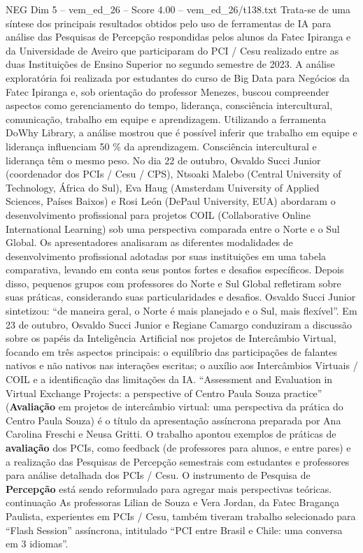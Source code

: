 \begin{textsample}{NEG Dim 5 – vem\_ed\_26 – Score 4.00 – vem\_ed\_26/t138.txt}
Trata-se de uma síntese dos principais resultados obtidos pelo uso de ferramentas de IA para análise das Pesquisas de Percepção respondidas pelos alunos da Fatec Ipiranga e da Universidade de Aveiro que participaram do PCI / Cesu realizado entre as duas Instituições de Ensino Superior no segundo semestre de 2023.
A análise exploratória foi realizada por estudantes do curso de Big Data para Negócios da Fatec Ipiranga e, sob orientação do professor Menezes, buscou compreender aspectos como gerenciamento do tempo, liderança, consciência intercultural, comunicação, trabalho em equipe e aprendizagem.
Utilizando a ferramenta DoWhy Library, a análise mostrou que é possível inferir que trabalho em equipe e liderança influenciam 50 \% da aprendizagem.
Consciência intercultural e liderança têm o mesmo peso.
No dia 22 de outubro, Osvaldo Succi Junior (coordenador dos PCIs / Cesu / CPS), Ntsoaki Malebo (Central University of Technology, África do Sul), Eva Haug (Amsterdam University of Applied Sciences, Países Baixos) e Rosi León (DePaul University, EUA) abordaram o desenvolvimento profissional para projetos COIL (Collaborative Online International Learning) sob uma perspectiva comparada entre o Norte e o Sul Global.
Os apresentadores analisaram as diferentes modalidades de desenvolvimento profissional adotadas por suas instituições em uma tabela comparativa, levando em conta seus pontos fortes e desafios específicos.
Depois disso, pequenos grupos com professores do Norte e Sul Global refletiram sobre suas práticas, considerando suas particularidades e desafios.
Osvaldo Succi Junior sintetizou: “de maneira geral, o Norte é mais planejado e o Sul, mais flexível”.
Em 23 de outubro, Osvaldo Succi Junior e Regiane Camargo conduziram a discussão sobre os papéis da Inteligência Artificial nos projetos de Intercâmbio Virtual, focando em três aspectos principais: o equilíbrio das participações de falantes nativos e não nativos nas interações escritas; o auxílio aos Intercâmbios Virtuais / COIL e a identificação das limitações da IA. “Assessment and Evaluation in Virtual Exchange Projects: a perspective of Centro Paula Souza practice” (\textbf{Avaliação} em projetos de intercâmbio virtual: uma perspectiva da prática do Centro Paula Souza) é o título da apresentação assíncrona preparada por Ana Carolina Freschi e Neusa Gritti.
O trabalho apontou exemplos de práticas de \textbf{avaliação} dos PCIs, como feedback (de professores para alunos, e entre pares) e a realização das Pesquisas de Percepção semestrais com estudantes e professores para análise detalhada dos PCIs / Cesu.
O instrumento de Pesquisa de \textbf{Percepção} está sendo reformulado para agregar mais perspectivas teóricas. continuação As professoras Lilian de Souza e Vera Jordan, da Fatec Bragança Paulista, experientes em PCIs / Cesu, também tiveram trabalho selecionado para “Flash Session” assíncrona, intitulado “PCI entre Brasil e Chile: uma conversa em 3 idiomas”.

\end{textsample}
